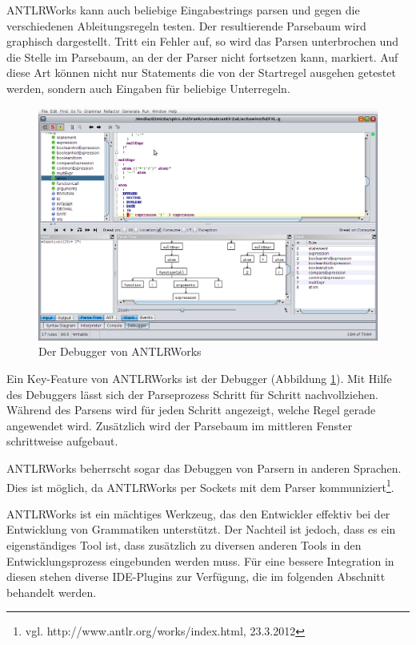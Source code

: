 ANTLRWorks kann auch beliebige Eingabestrings parsen und gegen die verschiedenen Ableitungsregeln testen. Der resultierende Parsebaum wird graphisch dargestellt. Tritt ein Fehler auf, so wird das Parsen unterbrochen und die Stelle im Parsebaum, an der der Parser nicht fortsetzen kann, markiert. Auf diese Art können nicht nur Statements die von der Startregel ausgehen getestet werden, sondern auch Eingaben für beliebige Unterregeln.


\begin{figure}[h]
\includegraphics[scale=0.35]{figures/antlrworks_debugger}
\caption{Der Debugger von ANTLRWorks}
\label{abb_antlrworks_debugger}
\end{figure}

Ein Key-Feature von ANTLRWorks ist der Debugger (Abbildung \ref{abb_antlrworks_debugger}). Mit Hilfe des Debuggers lässt sich der Parseprozess Schritt für Schritt nachvollziehen. Während des Parsens wird für jeden Schritt angezeigt, welche Regel gerade angewendet wird. Zusätzlich wird der Parsebaum im mittleren Fenster schrittweise aufgebaut.

ANTLRWorks beherrscht sogar das Debuggen von Parsern in anderen Sprachen. Dies ist möglich, da ANTLRWorks per Sockets mit dem Parser kommuniziert\footnote{ vgl. http://www.antlr.org/works/index.html, 23.3.2012}.


ANTLRWorks ist ein mächtiges Werkzeug, das den Entwickler effektiv bei der Entwicklung von Grammatiken unterstützt. Der Nachteil ist jedoch, dass es ein eigenständiges Tool ist, dass zusätzlich zu diversen anderen Tools in den Entwicklungsprozess eingebunden werden muss. Für eine bessere Integration in diesen stehen diverse IDE-Plugins zur Verfügung, die im folgenden Abschnitt behandelt werden.
 

